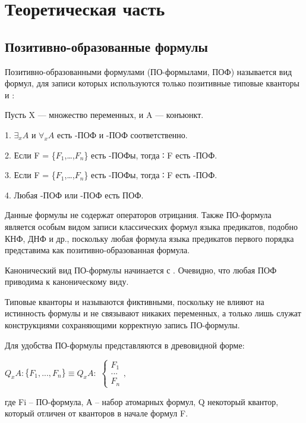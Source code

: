 \section{ Теоретическая часть}

\subsection{Позитивно-образованные формулы}

Позитивно-образованными формулами (ПО-формылами, ПОФ) называется вид формул, для записи которых используются только позитивные типовые кванторы \forall{}  и \exists:

Пусть X — множество переменных, и A — конъюнкт.

1. $\exists_x A$ и $\forall_x A$ есть \exists-ПОФ и \forall-ПОФ соответственно.

2. Если F = \{$F_1$,…,$F_n$\} есть \forall-ПОФы, тогда  ∶ F есть \exists-ПОФ.

3. Если F = \{$F_1$,…,$F_n$\} есть \exists-ПОФы, тогда  ∶ F есть \forall-ПОФ.

4. Любая \exists-ПОФ или \forall-ПОФ есть ПОФ.

Данные формулы не содержат операторов отрицания. Также ПО-формула является особым видом записи классических формул языка предикатов, подобно КНФ, ДНФ и др., поскольку любая формула языка предикатов первого порядка представима как позитивно-образованная формула.

Канонический вид ПО-формулы начинается с \forall\emptyset. Очевидно, что любая ПОФ приводима к каноническому виду. 

Типовые кванторы \forall\emptyset и \exists\emptyset называются фиктивными, поскольку не влияют на истинность формулы и не связывают никаких переменных, а только лишь служат конструкциями сохраняющими корректную запись ПО-формулы.

Для удобства ПО-формулы представляются в древовидной форме:

$Q_x A: $\{$F_1,...,F_n$\}$ \equiv Q_x A:  $
\begin{math}
    \begin{cases}
        F_1\\
        ...\\
        F_n
    \end{cases},
\end{math}

 где Fi – ПО-формула, А – набор атомарных формул, Q некоторый квантор, который отличен от кванторов в начале формул F.

